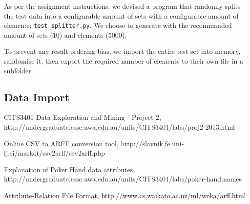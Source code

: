 \documentclass[11pt, a4paper]{article}
\begin{document}
As per the assignment instructions, we devised a program that randomly splits the test data into a configurable amount of sets with a configurable amount of elements; \texttt{test_splitter.py}. We choose to generate with the recommanded amount of sets (10) and elements (5000).

To prevent any result ordering bias, we import the entire test set into memory, randomise it, then export the required number of elements to their own file in a subfolder.

\subsection*{Data Import}



\begin{thebibliography}{9}

	CITS3401 Data Exploration and Mining - Project 2,
	http://undergraduate.csse.uwa.edu.au/units/CITS3401/labs/proj2-2013.html

	Online CSV to ARFF conversion tool,
	http://slavnik.fe.uni-lj.si/markot/csv2arff/csv2arff.php

	Explanation of Poker Hand data attributes,
	http://undergraduate.csse.uwa.edu.au/units/CITS3401/labs/poker-hand.names

	Attribute-Relation File Format,
	http://www.cs.waikato.ac.nz/ml/weka/arff.html

\end{thebibliography}


\end{document}
